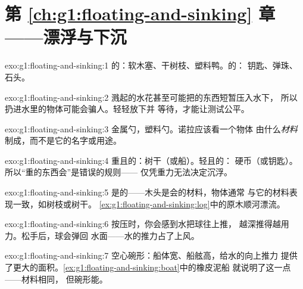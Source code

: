\section*{第 \ref{ch:g1:floating-and-sinking} 章——漂浮与下沉}

\begin{solution}{exo:g1:floating-and-sinking:1}
的：软木塞、干树枝、塑料鸭。的：
钥匙、弹珠、石头。
\end{solution}

\begin{solution}{exo:g1:floating-and-sinking:2}
溅起的水花甚至可能把的东西短暂压入水下，
所以扔进水里的物体可能会骗人。轻轻放下并
等待，才能让测试公平。
\end{solution}

\begin{solution}{exo:g1:floating-and-sinking:3}
金属勺，塑料勺。诺拉应该看一个物体
由什么\emph{材料}制成，而不是它的名字或用途。
\end{solution}

\begin{solution}{exo:g1:floating-and-sinking:4}
重且的：树干（或船）。轻且的：
硬币（或钥匙）。所以“重的东西会”是错误的规则——
仅凭重力无法决定沉浮。
\end{solution}

\begin{solution}{exo:g1:floating-and-sinking:5}
是的——木头是会的材料，物体通常
与它的材料表现一致，如树枝或树干。
\cref{ex:g1:floating-and-sinking:log}中的原木顺河漂流。
\end{solution}

\begin{solution}{exo:g1:floating-and-sinking:6}
按压时，你会感到水把球往上推，
越深推得越用力。松手后，球会弹回
水面——水的推力占了上风。
\end{solution}

\begin{solution}{exo:g1:floating-and-sinking:7}
空心碗形：船体宽、船舷高，给水的向上推力
提供了更大的面积。\cref{ex:g1:floating-and-sinking:boat}中的橡皮泥船
就说明了这一点——材料相同，
但碗形能。
\end{solution}

